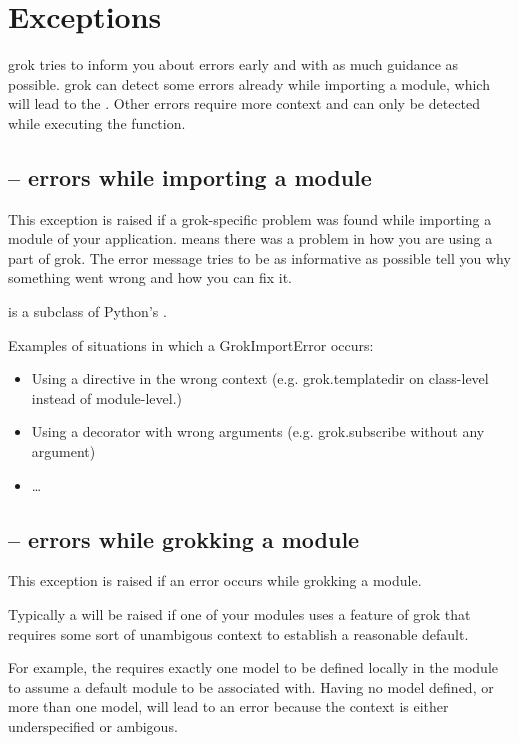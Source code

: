 \chapter{Exceptions}

grok tries to inform you about errors early and with as much guidance as
possible. grok can detect some errors already while importing a module, which
will lead to the .  Other errors require more context and can
only be detected while executing the  function.

    \section{ -- errors while importing a module}

    This exception is raised if a grok-specific problem was found while
    importing a module of your application.  means there
    was a problem in how you are using a part of grok. The error message tries
    to be as informative as possible tell you why something went wrong and how
    you can fix it.

     is a subclass of Python's .

    Examples of situations in which a GrokImportError occurs:

    \begin{itemize}
        \item Using a directive in the wrong context (e.g. grok.templatedir on
        class-level instead of module-level.)
        \item Using a decorator with wrong arguments (e.g. grok.subscribe
        without any argument)
        \item \ldots
    \end{itemize}

    \section{ -- errors while grokking a module}

    This exception is raised if an error occurs while grokking a module.

    Typically a  will be raised if one of your modules uses a
    feature of grok that requires some sort of unambigous context to establish
    a reasonable default.

    For example, the  requires exactly one model to be defined
    locally in the module to assume a default module to be associated with.
    Having no model defined, or more than one model, will lead to an error
    because the context is either underspecified or ambigous.

